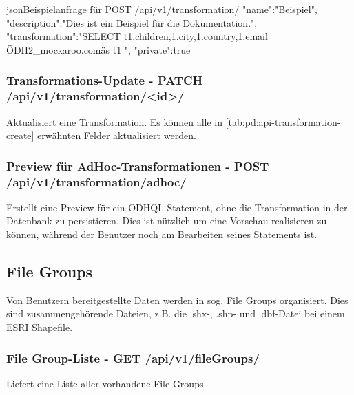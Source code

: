 \begin{srclst}{json}{Beispielanfrage für POST /api/v1/transformation/}
{
  "name":"Beispiel",
  "description":"Dies ist ein Beispiel für die Dokumentation.",
  "transformation":"SELECT t1.children,\nt1.city,\nt1.country,\nt1.email \nFROM \"ODH2_mockaroo.com\" as t1 \n",
  "private":true
}
\end{srclst}

\subsubsection{Transformations-Update - PATCH /api/v1/transformation/<id>/}
Aktualisiert eine Transformation. Es können alle in \cref{tab:pd:api-transformation-create} erwähnten Felder aktualisiert werden.

\subsubsection{Preview für AdHoc-Transformationen - POST /api/v1/transformation/adhoc/}
Erstellt eine Preview für ein ODHQL Statement, ohne die Transformation in der Datenbank zu persistieren. Dies ist nützlich um eine Vorschau realisieren zu können, während der Benutzer noch am Bearbeiten seines Statements ist.

\subsection{File Groups}\label{sec:pd:api-filegroups}
Von Benutzern bereitgestellte Daten werden in sog. File Groups organisiert. Dies sind zusammengehörende Dateien, z.B. die .shx-, .shp- und .dbf-Datei bei einem ESRI Shapefile.

\subsubsection{File Group-Liste - GET /api/v1/fileGroups/}
Liefert eine Liste aller vorhandene File Groups.

